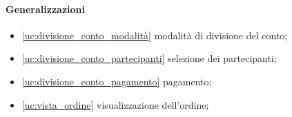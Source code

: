 \paragraph{Generalizzazioni}
\begin{itemize}
	\item \autoref{uc:divisione_conto_modalità} modalità di divisione del conto;
	\item \autoref{uc:divisione_conto_partecipanti} selezione dei partecipanti;
	\item \autoref{uc:divisione_conto_pagamento} pagamento;
	\item \autoref{uc:vista_ordine} visualizzazione dell'ordine;
\end{itemize}
